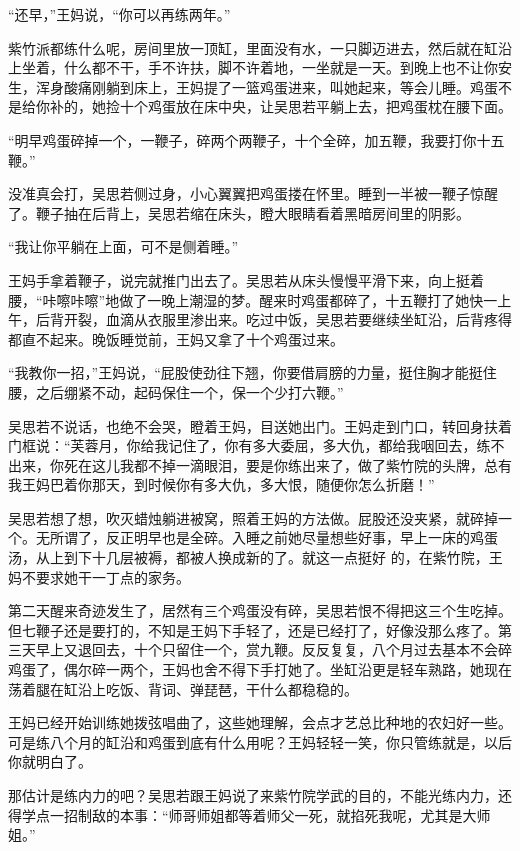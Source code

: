 “还早，”王妈说，“你可以再练两年。”

紫竹派都练什么呢，房间里放一顶缸，里面没有水，一只脚迈进去，然后就在缸沿上坐着，什么都不干，手不许扶，脚不许着地，一坐就是一天。到晚上也不让你安生，浑身酸痛刚躺到床上，王妈提了一篮鸡蛋进来，叫她起来，等会儿睡。鸡蛋不是给你补的，她捡十个鸡蛋放在床中央，让吴思若平躺上去，把鸡蛋枕在腰下面。

“明早鸡蛋碎掉一个，一鞭子，碎两个两鞭子，十个全碎，加五鞭，我要打你十五鞭。”

没准真会打，吴思若侧过身，小心翼翼把鸡蛋搂在怀里。睡到一半被一鞭子惊醒了。鞭子抽在后背上，吴思若缩在床头，瞪大眼睛看着黑暗房间里的阴影。

“我让你平躺在上面，可不是侧着睡。”

王妈手拿着鞭子，说完就推门出去了。吴思若从床头慢慢平滑下来，向上挺着腰，“咔嚓咔嚓”地做了一晚上潮湿的梦。醒来时鸡蛋都碎了，十五鞭打了她快一上午，后背开裂，血滴从衣服里渗出来。吃过中饭，吴思若要继续坐缸沿，后背疼得都直不起来。晚饭睡觉前，王妈又拿了十个鸡蛋过来。

“我教你一招，”王妈说，“屁股使劲往下翘，你要借肩膀的力量，挺住胸才能挺住腰，之后绷紧不动，起码保住一个，保一个少打六鞭。”

吴思若不说话，也绝不会哭，瞪着王妈，目送她出门。王妈走到门口，转回身扶着门框说：“芙蓉月，你给我记住了，你有多大委屈，多大仇，都给我咽回去，练不出来，你死在这儿我都不掉一滴眼泪，要是你练出来了，做了紫竹院的头牌，总有我王妈巴着你那天，到时候你有多大仇，多大恨，随便你怎么折磨！”

吴思若想了想，吹灭蜡烛躺进被窝，照着王妈的方法做。屁股还没夹紧，就碎掉一个。无所谓了，反正明早也是全碎。入睡之前她尽量想些好事，早上一床的鸡蛋汤，从上到下十几层被褥，都被人换成新的了。就这一点挺好
的，在紫竹院，王妈不要求她干一丁点的家务。

第二天醒来奇迹发生了，居然有三个鸡蛋没有碎，吴思若恨不得把这三个生吃掉。但七鞭子还是要打的，不知是王妈下手轻了，还是已经打了，好像没那么疼了。第三天早上又退回去，十个只留住一个，赏九鞭。反反复复，八个月过去基本不会碎鸡蛋了，偶尔碎一两个，王妈也舍不得下手打她了。坐缸沿更是轻车熟路，她现在荡着腿在缸沿上吃饭、背词、弹琵琶，干什么都稳稳的。

王妈已经开始训练她拨弦唱曲了，这些她理解，会点才艺总比种地的农妇好一些。可是练八个月的缸沿和鸡蛋到底有什么用呢？王妈轻轻一笑，你只管练就是，以后你就明白了。

那估计是练内力的吧？吴思若跟王妈说了来紫竹院学武的目的，不能光练内力，还得学点一招制敌的本事：“师哥师姐都等着师父一死，就掐死我呢，尤其是大师姐。”

